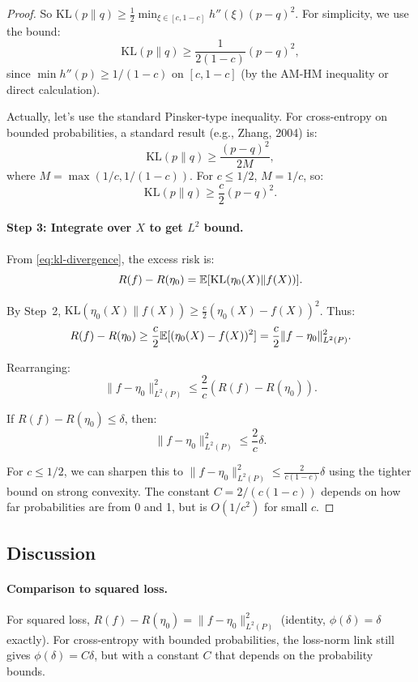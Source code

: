 \documentclass[12pt]{article}
\begin{document}
\begin{proof}
So $\text{KL}(p \| q) \ge \frac{1}{2} \min_{\xi \in [c,1-c]} h''(\xi) (p-q)^2$. For simplicity, we use the bound:
\[
\text{KL}(p \| q) \ge \frac{1}{2(1-c)} (p-q)^2,
\]
since $\min h''(p) \ge 1/(1-c)$ on $[c, 1-c]$ (by the AM-HM inequality or direct calculation).

Actually, let's use the standard Pinsker-type inequality. For cross-entropy on bounded probabilities, a standard result (e.g., Zhang, 2004) is:
\[
\text{KL}(p \| q) \ge \frac{(p - q)^2}{2 M},
\]
where $M = \max(1/c, 1/(1-c))$. For $c \le 1/2$, $M = 1/c$, so:
\[
\text{KL}(p \| q) \ge \frac{c}{2} (p - q)^2.
\]

\paragraph{Step 3: Integrate over $X$ to get $L^2$ bound.}

From \eqref{eq:kl-divergence}, the excess risk is:
\[
R(f) - R(\eta_0) = \mathbb{E}[\text{KL}(\eta_0(X) \| f(X))].
\]

By Step~2, $\text{KL}(\eta_0(X) \| f(X)) \ge \frac{c}{2} (\eta_0(X) - f(X))^2$. Thus:
\[
R(f) - R(\eta_0) \ge \frac{c}{2} \mathbb{E}[(\eta_0(X) - f(X))^2] = \frac{c}{2} \|f - \eta_0\|_{L^2(P)}^2.
\]

Rearranging:
\[
\|f - \eta_0\|_{L^2(P)}^2 \le \frac{2}{c} (R(f) - R(\eta_0)).
\]

If $R(f) - R(\eta_0) \le \delta$, then:
\[
\|f - \eta_0\|_{L^2(P)}^2 \le \frac{2}{c} \delta.
\]

For $c \le 1/2$, we can sharpen this to $\|f - \eta_0\|_{L^2(P)}^2 \le \frac{2}{c(1-c)} \delta$ using the tighter bound on strong convexity. The constant $C = 2/(c(1-c))$ depends on how far probabilities are from 0 and 1, but is $O(1/c^2)$ for small $c$.
\end{proof}

\subsection{Discussion}

\paragraph{Comparison to squared loss.}
For squared loss, $R(f) - R(\eta_0) = \|f - \eta_0\|_{L^2(P)}^2$ (identity, $\phi(\delta) = \delta$ exactly). For cross-entropy with bounded probabilities, the loss-norm link still gives $\phi(\delta) = C\delta$, but with a constant $C$ that depends on the probability bounds.
\end{document}
